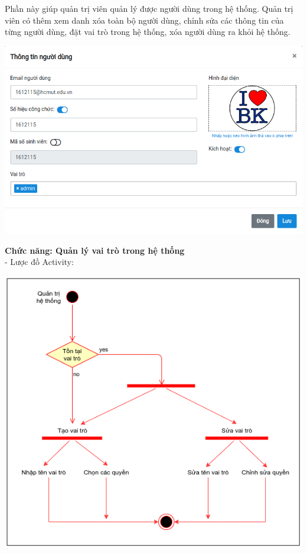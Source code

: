 Phần này giúp quản trị viên quản lý được người dùng trong hệ thống. Quản trị viên có thêm xem danh xóa toàn bộ người dùng, chỉnh sửa các thông tin của từng người dùng, đặt vai trò trong hệ thống, xóa người dùng ra khỏi hệ thống.\\
\begin{center}
  \captionsetup{type=figure}
  \includegraphics[scale=0.6]{img/Screen/editUser.png}
\end{center}
\textbf{Chức năng: Quản lý vai trò trong hệ thống}\\
- Lược đồ Activity:
\begin{center}
  \captionsetup{type=figure}
  \includegraphics[scale=0.6]{img/UML/Admin/addRole.png}
\end{center}
